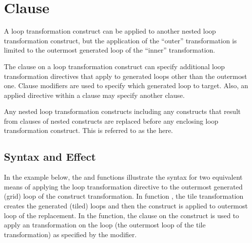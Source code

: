 \pagebreak
\section{ Clause}
\label{sec:apply_clause}



A loop transformation construct can be applied to another nested
loop transformation construct, but the application of the ``outer'' transformation
is limited to the outermost generated loop of the ``inner'' transformation.

The  clause on a loop transformation construct can specify additional
loop transformation directives that apply to generated loops other than the outermost one.
Clause modifiers are used to specify which generated loop to target.
Also, an applied directive within a clause may specify another  clause.


Any nested loop transformation constructs including any constructs that
result from  clauses of nested constructs are replaced before any enclosing
loop transformation construct. This is referred to as the 
here.

\subsection{Syntax and Effect}

In the example below, the  and  functions
illustrate the syntax for two equivalent means of applying the  loop transformation
directive to the outermost generated (grid) loop of the  construct transformation.
In function , the tile transformation creates the generated (tiled) loops
and then the  construct is applied to outermost loop of the replacement.
In the  function, the  clause on the  construct
is used to apply an  transformation on the  loop (the outermost loop
of the tile transformation) as specified by the  modifier.

